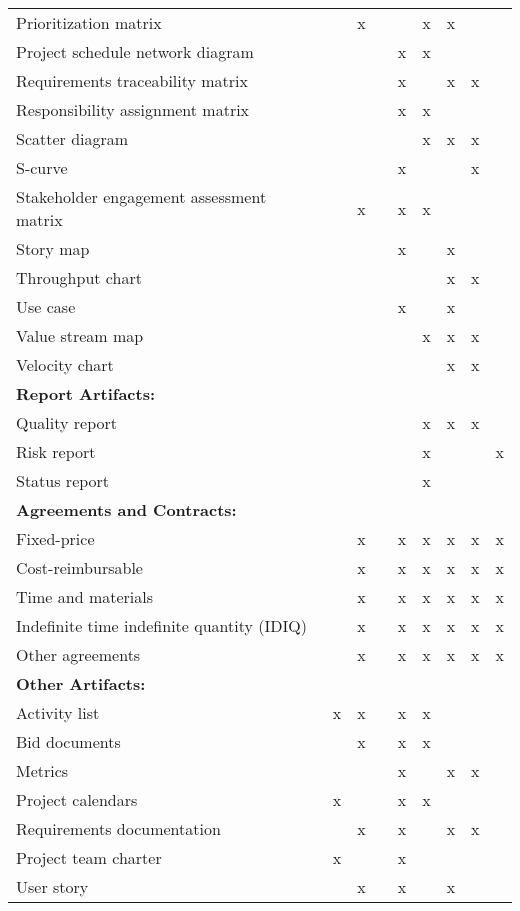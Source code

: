 \documentclass[11pt]{article}
\begin{document}
\begin{center}
\begin{tabular}{lllllllll}
Prioritization matrix &  & x &  &  & x & x &  & \\
Project schedule network diagram &  &  &  & x & x &  &  & \\
Requirements traceability matrix &  &  &  & x &  & x & x & \\
Responsibility assignment matrix &  &  &  & x & x &  &  & \\
Scatter diagram &  &  &  &  & x & x & x & \\
S-curve &  &  &  & x &  &  & x & \\
Stakeholder engagement assessment matrix &  & x &  & x & x &  &  & \\
Story map &  &  &  & x &  & x &  & \\
Throughput chart &  &  &  &  &  & x & x & \\
Use case &  &  &  & x &  & x &  & \\
Value stream map &  &  &  &  & x & x & x & \\
Velocity chart &  &  &  &  &  & x & x & \\
\hline
\textbf{Report Artifacts:} &  &  &  &  &  &  &  & \\
\hline
Quality report &  &  &  &  & x & x & x & \\
Risk report &  &  &  &  & x &  &  & x\\
Status report &  &  &  &  & x &  &  & \\
\hline
\textbf{Agreements and Contracts:} &  &  &  &  &  &  &  & \\
\hline
Fixed-price &  & x &  & x & x & x & x & x\\
Cost-reimbursable &  & x &  & x & x & x & x & x\\
Time and materials &  & x &  & x & x & x & x & x\\
Indefinite time indefinite quantity (IDIQ) &  & x &  & x & x & x & x & x\\
Other agreements &  & x &  & x & x & x & x & x\\
\hline
\textbf{Other Artifacts:} &  &  &  &  &  &  &  & \\
\hline
Activity list & x & x &  & x & x &  &  & \\
Bid documents &  & x &  & x & x &  &  & \\
Metrics &  &  &  & x &  & x & x & \\
Project calendars & x &  &  & x & x &  &  & \\
Requirements documentation &  & x &  & x &  & x & x & \\
Project team charter & x &  &  & x &  &  &  & \\
User story &  & x &  & x &  & x &  & \\
\end{tabular}
\end{center}
\end{document}
